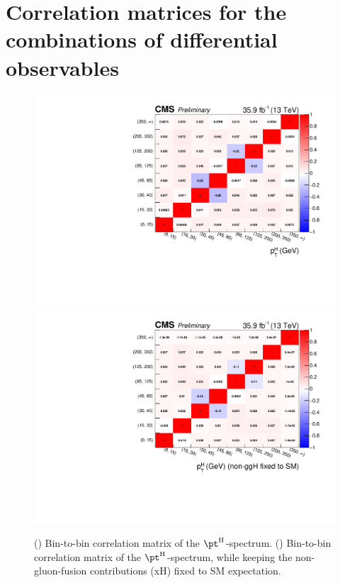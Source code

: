\appendix

\clearpage
\section{Correlation matrices for the combinations of differential observables}
\label{sec:binToBinCorrelationMatrices}

\begin{figure}[hbtp]
  \begin{center}
    \includegraphics[width=\cmsFigWidth]{img/correlationMatrices/corrMat_CORRMAT_combinedCard_smH_Nov07_MultiDimFit_mH125.pdf}
    \includegraphics[width=\cmsFigWidth]{img/correlationMatrices/corrMat_CORRMAT_combinedCard_Nov03_xHfixed_MultiDimFit_mH125.pdf}
    \caption{
        (\cmsLeft) Bin-to-bin correlation matrix of the $\pth$-spectrum.
        (\cmsRight) Bin-to-bin correlation matrix of the $\pth$-spectrum, while keeping the non-gluon-fusion contributions (xH) fixed to SM expectation.
        }
    \label{fig:corrMat_pth}
  \end{center}
\end{figure}

